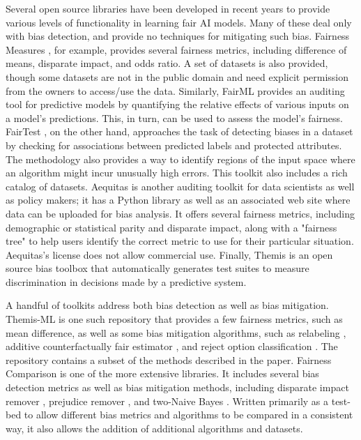\documentclass{article}
\begin{document}
Several open source libraries have been developed in recent years to provide various levels of functionality in learning fair AI models.  Many of these deal only with bias detection, and provide no techniques for mitigating such bias.  Fairness Measures \cite{ Zehlike2017}, for example, provides several fairness metrics, including difference of means, disparate impact, and odds ratio. A set of datasets is also provided, though some datasets are not in the public domain and need explicit permission from the owners to access/use the data.
Similarly, FairML \cite{ Adebayo2016} provides an auditing tool for predictive models by quantifying the relative effects of various inputs on a model’s predictions. This, in turn, can be used to assess the model’s fairness. 
%
FairTest \cite{Tramer2017}, on the other hand, approaches the task of detecting biases in a dataset by checking for associations between predicted labels and protected attributes.  The methodology also provides a way to identify regions of the input space where an algorithm might incur unusually high errors. This toolkit also includes a rich catalog of datasets. 
%
Aequitas \cite{Aequitas2018} is another auditing toolkit for data scientists as well as policy makers; it has a Python library as well as an associated web site where data can be uploaded for bias analysis. It offers several fairness metrics, including demographic or statistical parity and disparate impact, along with a "fairness tree" to help users identify the correct metric to use for their particular situation. Aequitas's license does not allow commercial use.
%
Finally, Themis \cite{Galhotra2017} is an open source bias toolbox that automatically generates test suites to measure discrimination in decisions made by a predictive system.

A handful of toolkits address both bias detection as well as bias mitigation. Themis-ML \cite{Bantilan2018} is one such repository that provides a few fairness metrics, such as mean difference, as well as some bias mitigation algorithms, such as relabeling \cite{KamiranCalders2012}, additive counterfactually fair estimator \cite{Kusner2017}, and reject option classification \cite{Kamiran2012}. 
The repository contains a subset of the methods described in the paper.
Fairness Comparison \cite{Freidler2018} is one of the more extensive libraries. It includes several bias detection metrics as well as bias mitigation methods, including disparate impact remover \cite{FeldmanFMSV2015}, prejudice remover \cite{kamishima2012fairness}, and two-Naive Bayes \cite{Calders2010}. Written primarily as a test-bed to allow different bias metrics and algorithms to be compared in a consistent way, it also allows the addition of additional algorithms and datasets.
\end{document}
